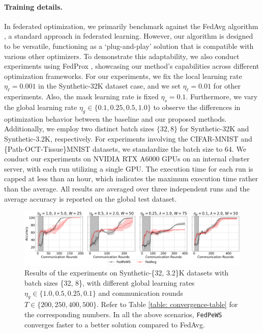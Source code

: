 \documentclass{article}
\begin{document}
\paragraph{Training details.} 
In federated optimization, we primarily benchmark against the FedAvg algorithm \citep{mcmahan2017communication}, a standard approach in federated learning. However, our algorithm is designed to be versatile, functioning as a `plug-and-play' solution that is compatible with various other optimizers. To demonstrate this adaptability, we also conduct experiments using FedProx \citep{li2020federated}, showcasing our method's capabilities across different optimization frameworks. For our experiments, we fix the local learning rate $\eta_{\ell}=0.001$ in the Synthetic-32K dataset case, and we set $\eta_{\ell}=0.01$ for other experiments. Also, the mask learning rate is fixed $\eta_s=0.1$. Furthermore, we vary the global learning rate $\eta_g \in \{0.1, 0.25, 0.5, 1.0\}$ to observe the differences in optimization behavior between the baseline and our proposed methods. Additionally, we employ two distinct batch sizes $\{32, 8\}$ for Synthetic-32K and Synthetic-3.2K, respectively. For experiments involving the CIFAR-MNIST and \{Path-OCT-Tissue\}MNIST datasets, we standardize the batch size to 64. 
We conduct our experiments on NVIDIA RTX A6000 GPUs on an internal cluster server, with each run utilizing a single GPU. The execution time for each run is capped at less than an hour, which indicates the maximum execution time rather than the average. All results are averaged over three independent runs and the average accuracy is reported on the global test dataset. 




\begin{figure}[t] 
    \centering
    \includegraphics[width=\linewidth]{images/comb-synth-4-line-v2.pdf}
    \caption{Results of the experiments on Synthetic-\{32, 3.2\}K datasets with batch sizes \{32, 8\}, with different global learning rates $\eta_g \in \{1.0, 0.5, 0.25, 0.1\}$ and communication rounds $T \in \{200, 250, 400, 500\}$. Refer to Table \ref{table: convergence-table} for the corresponding numbers. In all the above scenarios, \texttt{FedPeWS} converges faster to a better solution compared to FedAvg.}
    \label{fig: synthetic-all}
\end{figure}
\end{document}

